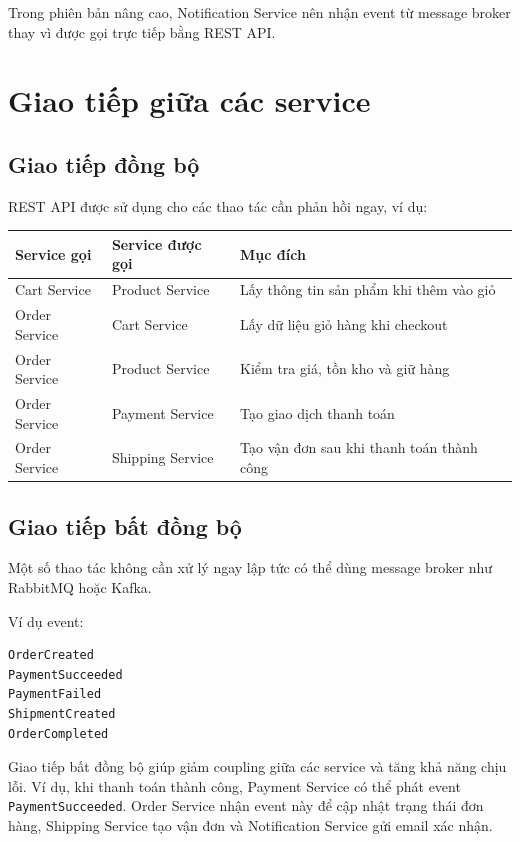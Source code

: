 Trong phiên bản nâng cao, Notification Service nên nhận event từ message broker thay vì được gọi trực tiếp bằng REST API.

\section{Giao tiếp giữa các service}

\subsection{Giao tiếp đồng bộ}

REST API được sử dụng cho các thao tác cần phản hồi ngay, ví dụ:

\begin{longtable}{|p{4cm}|p{4cm}|p{6cm}|}
\hline
\textbf{Service gọi} & \textbf{Service được gọi} & \textbf{Mục đích} \\
\hline
Cart Service & Product Service & Lấy thông tin sản phẩm khi thêm vào giỏ \\
\hline
Order Service & Cart Service & Lấy dữ liệu giỏ hàng khi checkout \\
\hline
Order Service & Product Service & Kiểm tra giá, tồn kho và giữ hàng \\
\hline
Order Service & Payment Service & Tạo giao dịch thanh toán \\
\hline
Order Service & Shipping Service & Tạo vận đơn sau khi thanh toán thành công \\
\hline
\end{longtable}

\subsection{Giao tiếp bất đồng bộ}

Một số thao tác không cần xử lý ngay lập tức có thể dùng message broker như RabbitMQ hoặc Kafka.

Ví dụ event:

\begin{lstlisting}[style=code]
OrderCreated
PaymentSucceeded
PaymentFailed
ShipmentCreated
OrderCompleted
\end{lstlisting}

Giao tiếp bất đồng bộ giúp giảm coupling giữa các service và tăng khả năng chịu lỗi. Ví dụ, khi thanh toán thành công, Payment Service có thể phát event \texttt{PaymentSucceeded}. Order Service nhận event này để cập nhật trạng thái đơn hàng, Shipping Service tạo vận đơn và Notification Service gửi email xác nhận.


